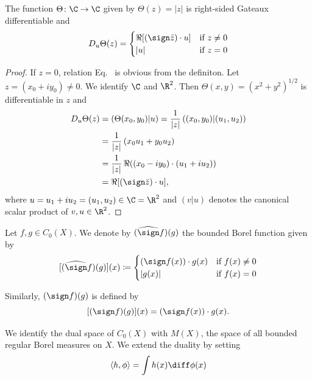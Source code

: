 \begin{lemma}\label{lem:b2-2.4}
The function $\Theta \colon \C \to \C$ given by $\Theta(z) = |z|$ is right-sided Gateaux differentiable and
\begin{equation}\label{eq:b2-2.6}
D_{u}\Theta(z) = \begin{cases}
    \Re[(\sign \bar{z}) \cdot u] & \text{if } z \neq 0 \\
    |u| & \text{if } z = 0
\end{cases}
\end{equation}
\end{lemma}
\begin{proof}
If\/ $z = 0$, relation Eq.~ is obvious from the definiton.
Let $z = (x_{0} + iy_{0}) \neq 0$.
We identify $\C$ and $\R^2$.
Then $\Theta(x,y) = (x^2 + y^2)^{1/2}$ is differentiable in $z$ and
\begin{align*}
D_{u}\Theta(z) &= (\Theta(x_{0},y_{0})|u) = \frac{1}{|z|}\, ((x_{0},y_{0})|(u_{1},u_{2}))  \\
               &= \frac{1}{|z|}\, (x_{0}u_{1} + y_{0}u_{2}) \\
               &= \frac{1}{|z|}\, \Re((x_{0}-iy_{0})\cdot(u_{1}+iu_{2})) \\
               &= \Re[(\sign \bar{z})\cdot u],
\end{align*}
where $u = u_{1} + iu_{2} = (u_{1},u_{2}) \in \C = \R^2$ and $(v|u)$ denotes the canonical scalar product of\/ $v,u \in \R^2$.
\end{proof}

Let $f, g \in C_{0}(X)$.
We denote by $(\widehat{\sign} f)(g)$ the bounded Borel function given by
\begin{equation}\label{eq:b2-2.7}
[(\widehat{\sign} f)(g)](x) \coloneqq \begin{cases}
    (\sign f(x))\cdot g(x) & \text{if } f(x) \neq 0 \\
    |g(x)| & \text{if } f(x) = 0
\end{cases}
\end{equation}

Similarly, $(\sign f)(g)$ is defined by
\begin{equation}\label{eq:b2-2.8}
[(\sign f)(g)](x) = ({\sign} f(x))\cdot g(x).
\end{equation}

We identify the dual space of\/ $C_{0}(X)$ with $M(X)$, the space of all bounded regular Borel measures on $X$.
We extend the duality by setting
\begin{equation*}
\langle h,\phi \rangle = \int h(x)   \diff\phi(x)
\end{equation*}

